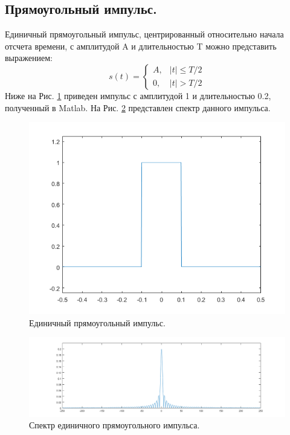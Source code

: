 \documentclass[a4paper,14pt]{extarticle}
\begin{document}
\subsection{Прямоугольный импульс.}
Единичный прямоугольный импульс, центрированный относительно начала отсчета времени, с амплитудой A и длительностью T можно представить выражением:
\begin{equation*}
s(t) = \begin{cases} A, & |t| \leq T/2 \\ 0, & |t| > T/2 \end{cases}
\end{equation*}
Ниже на Рис. \ref{rect} приведен импульс с амплитудой 1 и длительностью 0.2, полученный в Matlab. На Рис. \ref{rect_} представлен спектр данного импульса.
\begin{figure}[H]
\centering
\includegraphics[scale=0.75]{pics/rect.png}
\caption{Единичный прямоугольный импульс.}
\label{rect}
\end{figure}

\begin{figure}[H]
\centering
\includegraphics[scale=0.5]{pics/rect_spec.png}
\caption{Спектр единичного прямоугольного импульса.}
\label{rect_}
\end{figure}
\end{document}
